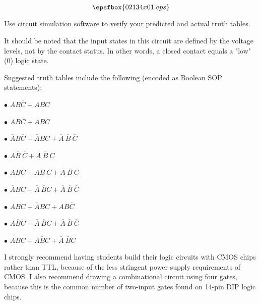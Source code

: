 

$$\epsfbox{02134x01.eps}$$

\vfil \eject






Use circuit simulation software to verify your predicted and actual truth tables.







It should be noted that the input states in this circuit are defined by the voltage levels, not by the contact status.  In other words, a closed contact equals a "low" (0) logic state.

\goodbreak
Suggested truth tables include the following (encoded as Boolean SOP statements):

\medskip
\item{$\bullet$} $AB\overline{C} + ABC$
\item{$\bullet$} $\overline{A}B\overline{C} + \overline{A}BC$
\item{$\bullet$} $\overline{A}B\overline{C} + \overline{A}BC + \overline{A} \> \overline{B} \> \overline{C}$
\item{$\bullet$} $A\overline{B} \> \overline{C} + A \> \overline{B} \> C$
\item{$\bullet$} $AB\overline{C} + A \overline{B} \> \overline{C} + \overline{A} \> \overline{B} \> \overline{C}$
\item{$\bullet$} $\overline{A}BC + \overline{A} \> \overline{B} C + \overline{A} \> \overline{B} \> \overline{C}$
\item{$\bullet$} $ABC + \overline{A}BC + AB \overline{C}$
\item{$\bullet$} $A\overline{B}C + \overline{A} \> \overline{B}C + \overline{A} \> \overline{B} \> \overline{C}$
\item{$\bullet$} $ABC + A \overline{B}C + \overline{A} \> \overline{B} C$
\medskip

I strongly recommend having students build their logic circuits with CMOS chips rather than TTL, because of the less stringent power supply requirements of CMOS.  I also recommend drawing a combinational circuit using four gates, because this is the common number of two-input gates found on 14-pin DIP logic chips.




